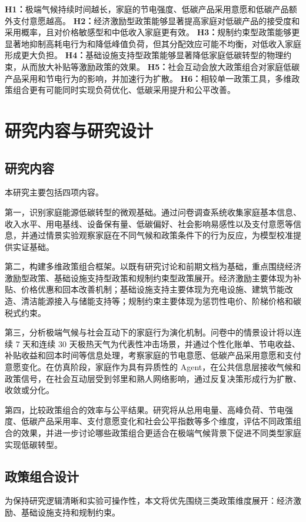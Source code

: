 \documentclass[12pt,a4paper]{ctexart}
\begin{document}
\textbf{H1：}极端气候持续时间越长，家庭的节电强度、低碳产品采用意愿和低碳产品额外支付意愿越高。  
\textbf{H2：}经济激励型政策能够显著提高家庭对低碳产品的接受度和采用概率，且对价格敏感型和中低收入家庭更有效。  
\textbf{H3：}规制约束型政策能够更显著地抑制高耗电行为和降低峰值负荷，但其分配效应可能不均衡，对低收入家庭形成更大负担。  
\textbf{H4：}基础设施支持型政策能够显著降低家庭低碳转型的物理约束，从而放大补贴等激励政策的效果。  
\textbf{H5：}社会互动会放大政策组合对家庭低碳产品采用和节电行为的影响，并加速行为扩散。  
\textbf{H6：}相较单一政策工具，多维政策组合更有可能同时实现负荷优化、低碳采用提升和公平改善。

\section{研究内容与研究设计}
\subsection{研究内容}
本研究主要包括四项内容。

第一，识别家庭能源低碳转型的微观基础。通过问卷调查系统收集家庭基本信息、收入水平、用电基线、设备保有量、低碳偏好、社会影响易感性以及支付意愿等信息，并通过情景实验观察家庭在不同气候和政策条件下的行为反应，为模型校准提供实证基础。

第二，构建多维政策组合框架。以既有研究讨论和前期文档为基础，重点围绕经济激励型政策、基础设施支持型政策和规制约束型政策展开。经济激励主要体现为补贴、价格优惠和回本改善机制；基础设施支持主要体现为充电设施、建筑节能改造、清洁能源接入与储能支持等；规制约束主要体现为惩罚性电价、阶梯价格和碳税式约束。

第三，分析极端气候与社会互动下的家庭行为演化机制。问卷中的情景设计将以连续 7 天和连续 30 天极热天气为代表性冲击场景，并通过个性化账单、节电收益、补贴收益和回本时间等信息处理，考察家庭的节电意愿、低碳产品采用意愿和支付意愿变化。在仿真阶段，家庭作为具有异质性的 Agent，在公共信息层接收气候和政策信号，在社会互动层受到邻里和熟人网络影响，通过反复决策形成行为扩散、收敛或分化。

第四，比较政策组合的效率与公平结果。研究将从总用电量、高峰负荷、节电强度、低碳产品采用率、支付意愿变化和社会公平指数等多个维度，评估不同政策组合的效果，并进一步讨论哪些政策组合更适合在极端气候背景下促进不同类型家庭实现低碳转型。

\subsection{政策组合设计}
为保持研究逻辑清晰和实验可操作性，本文将优先围绕三类政策维度展开：经济激励、基础设施支持和规制约束。
\end{document}
